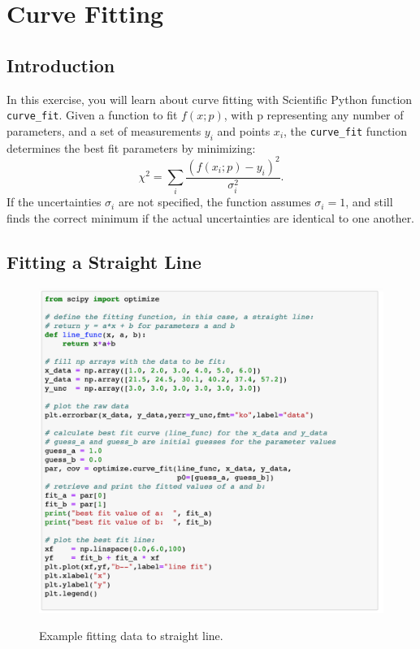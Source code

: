 \chapter{Curve Fitting}

\section{Introduction}

In this exercise, you will learn about curve fitting with Scientific Python
function {\tt curve{\_}fit}.  Given a function to fit $f(x;p)$, with p
representing any number of parameters, and a set of measurements $y_i$ and points $x_i$,
the {\tt curve{\_}fit} function determines the best fit parameters by
minimizing:
\begin{displaymath}
\chi^2 = \sum_i \frac{(f(x_i;p) - y_i) ^2}{\sigma_i^2}.
\end{displaymath}
If the uncertainties $\sigma_i$ are not specified, the function
assumes $\sigma_i = 1$, and still finds the correct minimum
if the actual uncertainties are identical to one another.

\section{Fitting a Straight Line}

\begin{figure}[htbp]
\begin{center}
\includegraphics[width=1.0\textwidth]{figs/fitting/fit_code.png} \\
\caption{Example fitting data to straight line.}
\label{fig:fiteg}
\end{center}
\end{figure}

